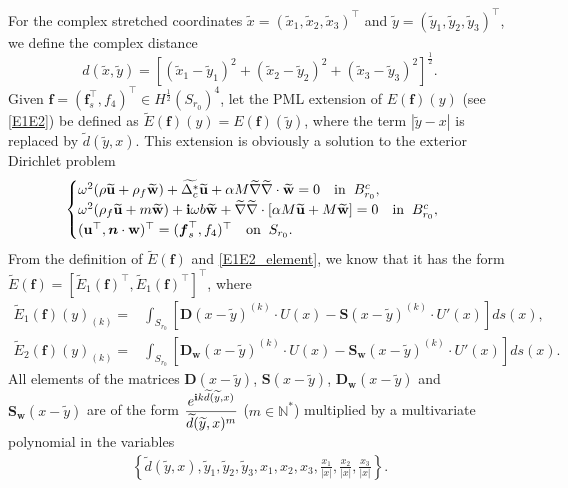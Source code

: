 \documentclass[11pt]{article}
\newcommand{\mat}{\mathbb}
\newcommand{\N}{{\mat N}}
\newcommand{\ds}{\displaystyle}
\newcommand{\De}{\Delta}
\newcommand{\wid}{\widetilde}
\newcommand{\bs}{\boldsymbol}
\begin{document}
For the complex stretched coordinates $\wid{x}=(\wid{x}_1,\wid{x}_2,\wid{x}_3)^{\top}$ 
and $\wid{y}=(\wid{y}_1,\wid{y}_2, \wid{y}_3)^{\top}$, we define the complex distance
\begin{equation}\label{complexdistance}
d(\wid{x},\wid{y})=\left[(\wid{x}_1-\wid{y}_1)^2+(\wid{x}_2-\wid{y}_2)^2
+(\wid{x}_3-\wid{y}_3)^2\right]^{\frac{1}{2}}.
\end{equation}
Given $\bs{f}=(\bs{f}_s^{\top},f_4)^{\top}\in H^{\frac{1}{2}}(S_{r_0})^4$, let the PML 
extension of $E(\bs{f})(y)$ (see \eqref{E1E2}) be defined as $\wid{E}(\bs{f})(y)=E(\bs{f})(\wid{y})$, 
where the term $|\wid{y}-x|$ is replaced by $\wid{d}(\wid{y},x)$.
This extension is obviously a solution to the exterior Dirichlet problem
\begin{equation}\label{PML_exterior}
\begin{cases}
\omega^2(\rho\wid{\mathbf{u}} +\rho_f \wid{\mathbf{w}})+\wid{\De_c^*}\wid{\mathbf{u}} 
+\alpha M\wid{\nabla} \wid{\nabla}\cdot  \wid{\mathbf{w}}=0\quad {\rm in}\;\;B_{r_0}^c,\\
\omega^2(\rho_f \wid{\mathbf{u}}+m \wid{\mathbf{w}})+{\bf{i}}\omega b \wid{\mathbf{w}}
+\wid{\nabla} \wid{\nabla} \cdot [\alpha M \wid{\mathbf{u}}+ M \wid{\mathbf{w}}]=0 
\quad {\rm in}\;\;B_{r_0}^c,\\
(\mathbf{u}^{\top},	\bs{n}\cdot \mathbf{w})^{\top}=(\bs{f}_s^{\top},f_4)^{\top}\quad {\rm on} \;\;S_{r_0}.
\end{cases}
\end{equation} 
From the definition of $\wid{E}(\bs{f})$ and \eqref{E1E2_element}, we know that it has the 
form $\wid{E}(\bs{f})=[\wid{E}_1(\bs{f})^{\top},\wid{E}_1(\bs{f})^{\top}]^{\top}$, where
\begin{equation}\label{E1E2_PML}
\begin{aligned}
\wid{E}_1(\bs{f})(y)_{(k)}=&\int_{S_{r_0}}[\bs{D}(x-\wid{y})^{(k)}\cdot U(x)
-\bs{S}(x-\wid{y})^{(k)}\cdot U'(x)]ds(x), \\
\wid{E}_2(\bs{f})(y)_{(k)}=&\int_{S_{r_0}}[\bs{D_w}(x-\wid{y})^{(k)}\cdot U(x)
-\bs{S_w}(x-\wid{y})^{(k)}\cdot U'(x)]ds(x).
\end{aligned}
\end{equation}
All elements of the matrices $\bs{D}(x-\wid{y})$, $\bs{S}(x-\wid{y})$, $\bs{D_w}
(x-\wid{y})$ and $\bs{S_w}(x-\wid{y})$  are of the form $\ds\frac{e^{{\bf i}
k\wid{d}(\wid{y},x)}}{\wid{d}(\wid{y},x)^m}$ ($m\in\N^*$) multiplied by a 
multivariate polynomial in the variables
$$\begin{aligned}
\left\{  \wid{d}(\wid{y},x),\wid{y}_1,\wid{y}_2,\wid{y}_3,x_1,x_2,x_3,
\frac{x_1}{|x|},\frac{x_2}{|x|},\frac{x_3}{|x|} \right\}.
\end{aligned}$$
\end{document}

